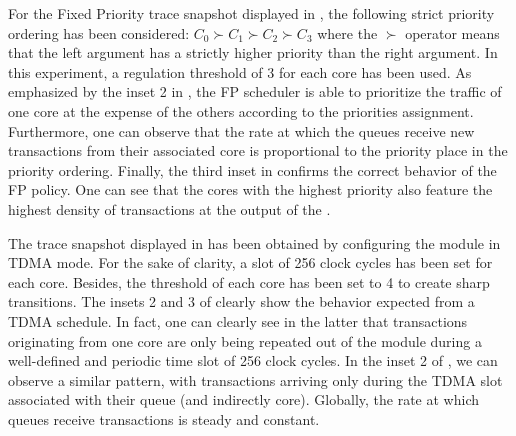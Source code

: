For the Fixed Priority trace snapshot displayed in
, the following strict priority ordering
has been considered: $C_{0} \succ C_{1} \succ C_{2} \succ C_{3}$ where
the $\succ$ operator means that the left argument has a strictly
higher priority than the right argument. In this experiment, a
regulation threshold of 3 for each core has been used.  As emphasized
by the inset 2 in , the FP scheduler is
able to prioritize the traffic of one core at the expense of the
others according to the priorities assignment. Furthermore, one can
observe that the rate at which the queues receive new transactions
from their associated core is proportional to the priority place in
the priority ordering.  Finally, the third inset in
 confirms the correct behavior of the FP
policy.%
One can see that the cores with the highest priority also feature the
highest density of transactions at the output of the \schim.

The trace snapshot displayed in  has
been obtained by configuring the \schim module in TDMA mode. For the
sake of clarity, a slot of 256 clock cycles has been set for each
core. Besides, the threshold of each core has been set to 4 to
create sharp transitions.  The insets 2 and 3 of
 clearly show the behavior expected
from a TDMA schedule. In fact, one can clearly see in the latter that
transactions originating from one core are only being repeated out of
the \schim module during a well-defined and periodic time slot of 256 clock cycles. In the inset 2 of , we can
observe a similar pattern, with transactions arriving only during the
TDMA slot associated with their queue (and indirectly core). Globally,
the rate at which queues receive transactions is steady and constant.

